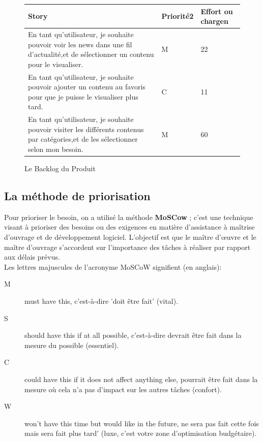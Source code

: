\begin{figure}[h]
\begin{tabular}{|p{7cm}|p{4cm}|p{4cm}|}
\hline
\textbf{Story} & \textbf{Priorité2 } & \textbf{Effort ou chargen} \\
\hline
En tant qu'utilisateur, je souhaite pouvoir voir les news dans une fil d'actualité,et de sélectionner un contenu pour le visualiser. & \begin{center}M\end{center} & \begin{center}22\end{center}\\
\hline
En tant qu'utilisateur, je souhaite pouvoir ajouter un contenu au favoris pour que je puisse le visualiser plus tard. & \begin{center}C\end{center} & \begin{center}11\end{center}\\
\hline
En tant qu'utilisateur, je souhaite pouvoir visiter les différents contenus par catégories,et de les sélectionner selon mon besoin. & \begin{center}M\end{center} & \begin{center}60\end{center}\\
\hline
\end{tabular}
  \caption{Le Backlog du Produit}
  \label{fig:Backlog}
\end{figure}
\subsection{La méthode de priorisation}
Pour prioriser le besoin, on a utilisé la méthode  \textbf{MoSCow} ; c'est une technique visant à prioriser des besoins ou des exigences en matière d'assistance à maîtrise d'ouvrage et de développement logiciel. L'objectif est que le maître d'œuvre et le maître d'ouvrage s'accordent sur l'importance des tâches à réaliser par rapport aux délais prévus.\\[0.2cm]
Les lettres majuscules de l'acronyme MoSCoW signifient (en anglais):\\[0.2cm]
\begin{description}
\item[M] must have this, c'est-à-dire 'doit être fait' (vital).
\item[S] should have this if at all possible, c'est-à-dire devrait être fait dans la mesure du possible (essentiel).
\item[C] could have this if it does not affect anything else, pourrait être fait dans la mesure où cela n'a pas d'impact sur les autres tâches (confort).
\item[W] won't have this time but would like in the future, ne sera pas fait cette fois mais sera fait plus tard' (luxe, c'est votre zone d'optimisation budgétaire).
\end{description}






